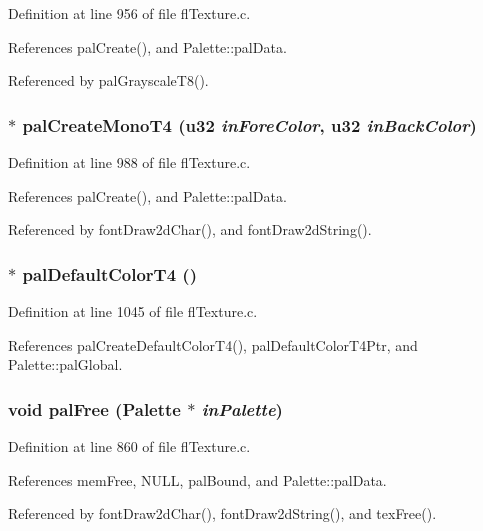 Definition at line 956 of file fl\-Texture.c.

References pal\-Create(), and Palette::pal\-Data.

Referenced by pal\-Grayscale\-T8().
\subsubsection{$\ast$ pal\-Create\-Mono\-T4 (u32 {\em in\-Fore\-Color}, u32 {\em in\-Back\-Color})}\label{flTexture_8h_5eeec9707c8c18854c134ea6860946f4}




Definition at line 988 of file fl\-Texture.c.

References pal\-Create(), and Palette::pal\-Data.

Referenced by font\-Draw2d\-Char(), and font\-Draw2d\-String().
\subsubsection{$\ast$ pal\-Default\-Color\-T4 ()}\label{flTexture_8h_7a829d96ab4f8371f9696c22a913160e}




Definition at line 1045 of file fl\-Texture.c.

References pal\-Create\-Default\-Color\-T4(), pal\-Default\-Color\-T4Ptr, and Palette::pal\-Global.
\subsubsection{\setlength{\rightskip}{0pt plus 5cm}void pal\-Free ({\bf Palette} $\ast$ {\em in\-Palette})}\label{flTexture_8h_306915805350c2933a2ccfee61cfc7da}




Definition at line 860 of file fl\-Texture.c.

References mem\-Free, NULL, pal\-Bound, and Palette::pal\-Data.

Referenced by font\-Draw2d\-Char(), font\-Draw2d\-String(), and tex\-Free().
